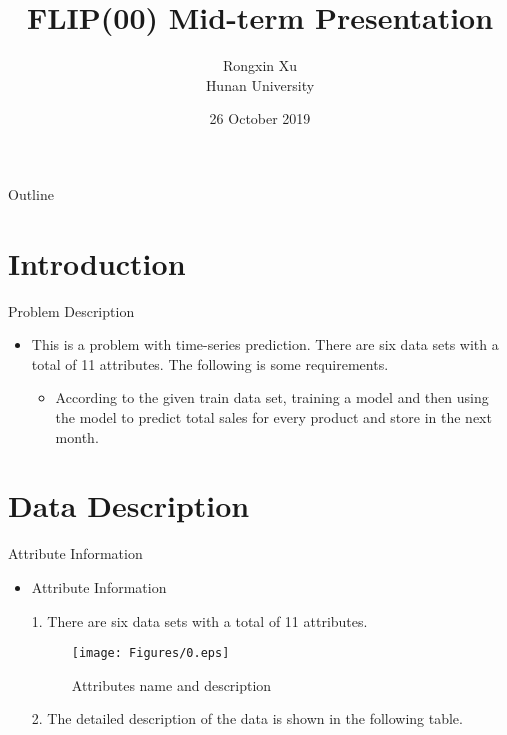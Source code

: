\documentclass[
 size=12pt,
 paper=smartboard, %
 mode=present, %
 display=slides, %
 style=tuliplab,  %
 pauseslide,
 fleqn,leqno,clock]{powerdot}
\title{FLIP(00) Mid-term Presentation}
\author{Rongxin Xu\\
Hunan University
}
\date{26 October 2019}
\begin{document}
\maketitle

\begin{slide}[toc=,bm=]{Outline}
  \tableofcontents[content=sections]
\end{slide}

\section{Introduction}

\begin{slide}{Problem Description}
  \begin{itemize}
    \item<1->
          This is a problem with time-series prediction.
          There are six data sets with a total of 11 attributes.
          The following is some requirements.
          \begin{itemize}
            \item<2->
                  According to the given train data set,
                  training a model and then using the model to predict total sales for every product and store in the next month.
          \end{itemize}
  \end{itemize}
\end{slide}

\section{Data Description}
%
\begin{slide}{Attribute Information}
  \begin{itemize}
    \item<1->
          Attribute Information
    \item[1.]
          There are six data sets with a total of 11 attributes.
          \begin{figure}
            \centering
            \texttt{[image: Figures/0.eps]}
            \caption{Attributes name and description}
            \label{Attributes name and description}
          \end{figure}
    \item[2.]
          The detailed description of the data is shown in the following table.
  \end{itemize}
\end{slide}
\end{document}
